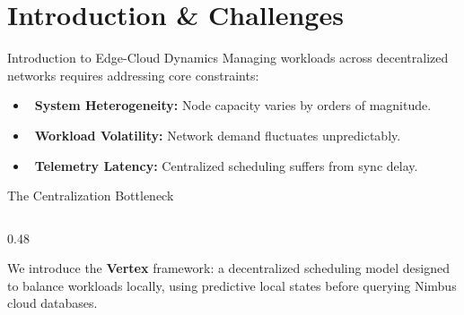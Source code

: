 \section{Introduction \& Challenges}

\begin{frame}{Introduction to Edge-Cloud Dynamics}
  Managing workloads across decentralized networks requires addressing core constraints:
  \begin{itemize}[<+-| alert@+>]
    \item \faServer\ \textbf{System Heterogeneity:} Node capacity varies by orders of magnitude.
    \item \faNetworkWired\ \textbf{Workload Volatility:} Network demand fluctuates unpredictably.
    \item \faClock\ \textbf{Telemetry Latency:} Centralized scheduling suffers from sync delay.
  \end{itemize}
\end{frame}

\begin{frame}{The Centralization Bottleneck}
  \begin{columns}[T]
    \begin{column}{0.48\textwidth}
      \begin{tcolorbox}[colframe=tPrim, colback=tBg, title=Proposed Objectives]
        We introduce the \textbf{Vertex} framework: a decentralized scheduling model designed to balance workloads locally, using predictive local states before querying Nimbus cloud databases.
      \end{tcolorbox}
    \end{column}
  \end{columns}
\end{frame}

